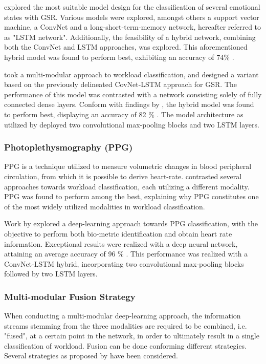 \documentclass[12pt]{article}
\begin{document}
 explored the most suitable model design for the classification of several emotional states with GSR. Various models were explored, amongst others a support vector machine, a ConvNet and a long-short-term-memory network, hereafter referred to as "LSTM network". Additionally, the feasibility of a hybrid network, combining both the ConvNet and LSTM approaches, was explored. This aforementioned hybrid model was found to perform best, exhibiting an accuracy of 74\% \cite{sun2019hybrid}. 

 took a multi-modular approach to workload classification, and designed a variant based on the previously delineated CovNet-LSTM approach for GSR. The performance of this model was contrasted with a network consisting solely of fully connected dense layers. Conform with findings by  , the hybrid model was found to perform best, displaying an accuracy of 82 \% \cite{dolmans2020perceived}. The model architecture as utilized by  deployed two convolutional max-pooling blocks and two LSTM layers.

\subsubsection{Photoplethysmography (PPG)}
PPG is a technique utilized to measure volumetric changes in blood peripheral circulation, from which it is possible to derive heart-rate.  contrasted several approaches towards workload classification, each utilizing a different modality. PPG was found to perform among the best, explaining why PPG constitutes one of the most widely utilized modalities in workload classification. 

Work by  explored a deep-learning approach towards PPG classification, with the objective to perform both bio-metric identification and obtain heart rate information. Exceptional results were realized with a deep neural network, attaining an average accuracy of 96 \% \cite{biswas2019cornet}. This performance was realized with a ConvNet-LSTM hybrid, incorporating two convolutional max-pooling blocks followed by two LSTM layers. 

\subsubsection{Multi-modular Fusion Strategy}  
When conducting a multi-modular deep-learning approach, the information streams stemming from the three modalities are required to be combined, i.e. "fused", at a certain point in the network, in order to ultimately result in a single classification of workload. Fusion can be done conforming different strategies. Several strategies as proposed by  have been considered.
\end{document}
